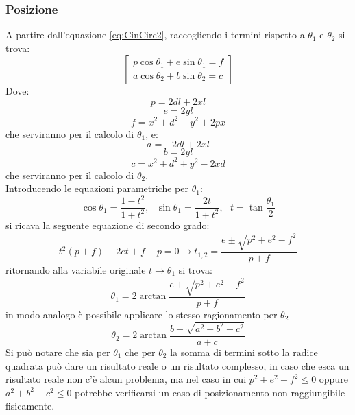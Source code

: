\subsubsection{Posizione}
A partire dall'equazione \ref{eq:CinCirc2}, raccogliendo i termini rispetto a $\theta_1$ e $\theta_2$ si trova:
\begin{equation*}
	\begin{bmatrix}
	p\cos\theta_1 +e\sin\theta_1 = f \\
	a\cos\theta_2 +b\sin\theta_2 = c
	\end{bmatrix}
\end{equation*}
Dove:
\begin{equation*}
    p = 2dl + 2xl
\end{equation*}
\begin{equation*}
	e = 2yl
\end{equation*}
\begin{equation*}
	f = x^2+d^2+y^2+2px
\end{equation*}
che serviranno per il calcolo di $\theta_1$, e:
\begin{equation*}
 a = -2dl+2xl
\end{equation*}
\begin{equation*}
	b = 2yl
\end{equation*}
\begin{equation*}
	c = x^2+d^2+y^2-2xd
\end{equation*}
che serviranno per il calcolo di $\theta_2$. 
\\Introducendo le equazioni parametriche per $\theta_1$:
\begin{equation*}
	\cos\theta_1 = \frac{1-t^2}{1+t^2}, \ \ \ \sin\theta_1 = \frac{2t}{1+t^2}, \ \ \ t =\tan \frac{\theta_1}{2}
\end{equation*}
si ricava la seguente equazione di secondo grado:
\begin{equation*}
	t^2(p+f) - 2et+f-p = 0\rightarrow t_{1,2} = \frac{e \pm \sqrt{p^2+e^2-f^2}}{p+f}
\end{equation*}
ritornando alla variabile originale $t\rightarrow \theta_1$ si trova:
\begin{equation}
    \theta_1 = 2\arctan\frac{e+\sqrt{p^2+e^2-f^2}}{p+f}
\end{equation}
in modo analogo è possibile applicare lo stesso ragionamento per $\theta_2$                         
\begin{equation}
    \theta_2 = 2\arctan\frac{b-\sqrt{a^2+b^2-c^2}}{a+c}
\end{equation}
Si può notare che sia per $\theta_1$ che per $\theta_2$ la somma di termini sotto la radice quadrata può dare un risultato reale o un risultato complesso, in caso che esca un risultato reale non c'è alcun problema, ma nel caso in cui $p^2 + e^2 -f^2 \le 0$ oppure $a^2 + b^2 -c^2 \le 0$ potrebbe verificarsi un caso di posizionamento non raggiungibile fisicamente.
